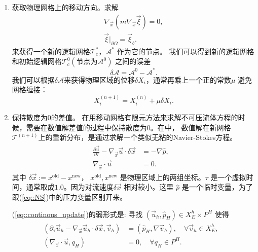 \begin{enumerate}[step 1]
     \item 获取物理网格上的移动方向。求解
       \begin{equation}
         \begin{aligned}
           \nabla_{\vec{x}}(m \nabla_{\vec{x}} \vec{\xi}) = 0, \\
           \vec{\xi}|_{\partial \Omega} = \vec{\xi}_b.
         \end{aligned}
         \label{eq::logical}
       \end{equation}
       来获得一个新的逻辑网格$\mathcal{T}_c^*$，$\mathcal{A}^*$ 作为它的节点。
       我们可以得到新的逻辑网格和初始逻辑网格$\mathcal{T}_c^0(\mbox{节点为} \mathcal{A}^0)$
       之间的误差
       \begin{equation}
         \delta \mathcal{A} = \mathcal{A}^0 - \mathcal{A}^*.
       \end{equation}
       我们可以根据$\delta \mathcal{A}$来获得物理区域的位移$\delta X_i$，通常再乘上一个正的常数$\mu$
       避免网格缠接：
       \begin{equation}
         X_i^{(n + 1)} = X_i^{(n)} + \mu \delta X_i.
       \end{equation}
     \item 保持散度为0的差值。
       在用移动网格有限元方法来求解不可压流体方程的时候，需要在数值解差值的过程中保持散度为0。在\cite{di2005moving}中，
       数值解在新网格$\mathcal{T}^{(n + 1)}$上的重新分布，是通过求解一个类似无粘的Navier-Stokes方程。
       \begin{eqnarray}
         \begin{aligned}
           \frac{\partial \vec{u}}{\partial \tau} - \nabla_{\vec{x}}\vec{u}
           \cdot \delta \vec{x} & =  - \nabla \hat{p},& \\
           \nabla_{\vec{x}}\cdot \vec{u} & =  0.&
         \end{aligned}
         \label{eq::continous_update}
       \end{eqnarray}
       其中 $\delta \vec{x} := x^{\text{old}} - x^{\text{new}}$，
       $x^{\text{old}}, x^{\text{new}}$ 是物理区域上的两组坐标。$\tau$ 是一个虚拟时间，通常取成$1.0$。因为对流速度$\delta \vec{x}$
       相对较小。这里 $\hat{p}$ 是一个临时变量，为了跟(\ref{eq::NS})中的压力变量区别开来。

       (\ref{eq::continous_update})的弱形式是: 寻找 $(\vec{u}_h, \hat{p}_H) \in X_E^h \times P^H$ 使得
       \begin{eqnarray}
         \begin{aligned}
           \left( \partial_{\tau} \vec{u}_h - \nabla_{\vec{x}}\vec{u}_h
           \cdot \delta \vec{x}, \vec{v}_h \right) & =  \left( \hat{p}_H, \nabla
           \vec{v}_h \right), \quad \forall \vec{v}_h \in X_E^h,&  \\
           \left( \nabla_{\vec{x}} \cdot \vec{u}, q_H\right) & =  0, \quad \forall
           q_H \in P^H. &
         \end{aligned}
         \label{eq::semi_discreted_update}
       \end{eqnarray}


\end{enumerate}
